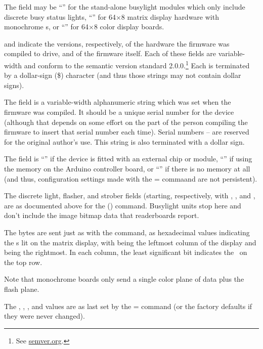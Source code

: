 The  field may be %
``'' for the stand-alone busylight modules which only include discrete busy status lights,
``'' for 64$\times$8 matrix display hardware with monochrome \led s, or
``'' for 64$\times$8  color display boards.

 and  indicate the versions, respectively, of the 
hardware the firmware was compiled to drive, and of the firmware itself. Each of
these fields are variable-width and conform to the semantic version standard 2.0.0.\footnote{See
\href{https://semver.org}{semver.org}.} Each is terminated by a dollar-sign (\z\$) character (and
thus those strings may not contain dollar signs).

The  field is a variable-width alphanumeric string which was set when the firm\-ware was
compiled. It should be a unique serial number for the device (although that depends on
some effort on the part of the person compiling the firmware to insert that serial number
each time). Serial numbers -- are reserved for the original author's use. This string is also
terminated with a dollar sign.

The  field is ``'' if the device is fitted with an external  chip or module,
``'' if using the  memory on the Arduino controller board, or ``\z{\_}'' if there
is no  memory at all (and thus, configuration settings made with the \z= commaand
are not persistent).

The discrete light, flasher, and strober fields (starting, respectively, with , , and ,
are as documented above for the  () command. Busylight units stop here and don't include
the image bitmap data that readerboards report.

The  bytes are sent just as with the  command, as hexadecimal values indicating
the \led s lit on the matrix display, with  being the leftmost column of the display
and  being the rightmost. In each column, the least significant bit indicates
the \led\ on the top row.

Note that monochrome boards only send a single color plane of data plus the flash plane.

The , , , and  values are as last set by the \z= command (or the factory
defaults if they were never changed).

